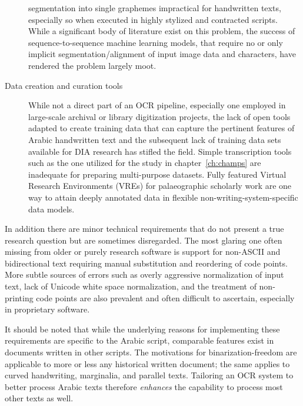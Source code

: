 \begin{description}
		segmentation into single graphemes impractical for handwritten
		texts, especially so when executed in highly stylized and
		contracted scripts. While a significant body of literature
		exist on this problem, the success of sequence-to-sequence
		machine learning models, that require no or only implicit
		segmentation/alignment of input image data and characters, have
		rendered the problem largely moot.
	\item[Data creation and curation tools] While not a direct part of an
		OCR pipeline, especially one employed in large-scale archival
		or library digitization pro\-jects, the lack of open tools
		adapted to create training data that can capture the pertinent
		features of Arabic handwritten text and the subsequent lack of
		training data sets available for DIA research has stifled the
		field. Simple transcription tools such as the one utilized for
		the study in chapter~\ref{ch:champs} are inadequate for
		preparing multi-purpose datasets. Fully featured Virtual
		Research Environments (VREs) for palaeographic scholarly work
		are one way to attain deeply annotated data in flexible
		non-writing-system-specific data models.
\end{description}

In addition there are minor technical requirements that do not present a true
research question but are sometimes disregarded. The most glaring one often
missing from older or purely research software is support for non-ASCII and
bidirectional text requiring manual substitution and reordering of code points.
More subtle sources of errors such as overly aggressive normalization of input
text, lack of Unicode white space normalization, and the treatment of
non-printing code points are also prevalent and often difficult to ascertain,
especially in proprietary software. 

It should be noted that while the underlying reasons for implementing these
requirements are specific to the Arabic script, comparable features exist in
documents written in other scripts. The motivations for binarization-freedom
are applicable to more or less any historical written document; the same
applies to curved handwriting, marginalia, and parallel texts. Tailoring an OCR
system to better process Arabic texts therefore \emph{enhances} the capability
to process most other texts as well.

\printbibliography[heading=subbibliography]
\endrefsection
